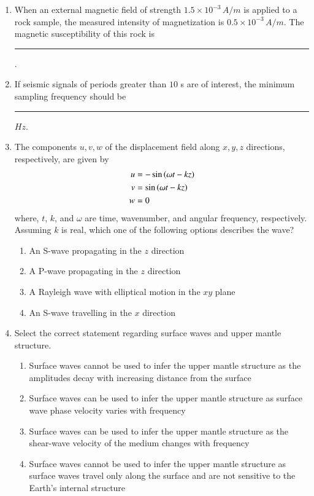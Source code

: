 \documentclass[journal,12pt,onecolumn]{IEEEtran}
\theoremstyle{remark}
\begin{document}
\begin{enumerate}
\item When an external magnetic field of strength $1.5 \times 10^{-3}\,A/m$ is applied to a rock sample, the measured intensity of magnetization is $0.5 \times 10^{-3}\,A/m$. The magnetic susceptibility of this rock is \rule{3cm}{0.15mm}.  \hfill{}

\item If seismic signals of periods greater than $10$ s are of interest, the minimum sampling frequency should be \rule{3cm}{0.15mm} $Hz$.  \hfill{}

\item The components $ u, v, w$ of the displacement field along $x, y, z$ directions, respectively, are given by
\begin{align*}
u &= -\sin\left(\omega t - kz\right) \\
v &= \sin\left(\omega t - kz\right) \\
w &= 0
\end{align*}
where, $t$, $k$, and $\omega$ are time, wavenumber, and angular frequency, respectively. Assuming $k$ is real, which one of the following options describes the wave? \hfill{}
\begin{enumerate}
    \item An S-wave propagating in the $z$ direction
    \item A P-wave propagating in the $z$ direction
    \item A Rayleigh wave with elliptical motion in the $xy$ plane
    \item An S-wave travelling in the $x$ direction
\end{enumerate}

\item Select the correct statement regarding surface waves and upper mantle structure. \hfill{}
\begin{enumerate}
    \item Surface waves cannot be used to infer the upper mantle structure as the amplitudes decay with increasing distance from the surface
    \item Surface waves can be used to infer the upper mantle structure as surface wave phase velocity varies with frequency
    \item Surface waves can be used to infer the upper mantle structure as the shear-wave velocity of the medium changes with frequency
    \item Surface waves cannot be used to infer the upper mantle structure as surface waves travel only along the surface and are not sensitive to the Earth's internal structure
\end{enumerate}


\end{enumerate}
\end{document}
